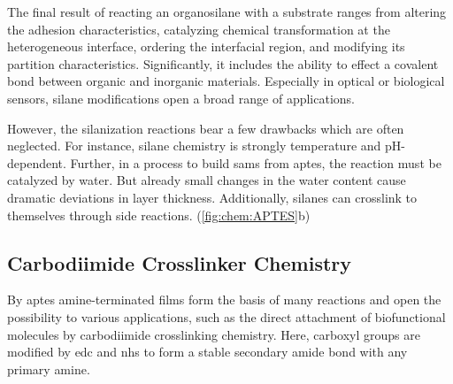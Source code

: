 The final result of reacting an organosilane with a substrate ranges from altering the adhesion characteristics, catalyzing chemical transformation at the heterogeneous interface, ordering the interfacial region, and modifying its partition characteristics. Significantly, it includes the ability to effect a covalent bond between organic and inorganic materials. Especially in optical or biological sensors, silane modifications open a broad range of applications.\cite{lit:chem:sin:langeDiss,lit:Anti-EpCAM-PAA,lit:chem:aptes:SilaneReview}

However, the silanization reactions bear a few drawbacks which are often neglected. For instance, silane chemistry is strongly temperature and pH-dependent.\cite{lit:chem:silaizationTemp,lit:chem:silanizationParameters} Further, in a process to build \glspl{sam} from \gls{aptes}, the reaction must be catalyzed by water. But already small changes in the water content cause dramatic deviations in layer thickness.\cite{lit:chem:sin:selectivemod} Additionally, silanes can crosslink to themselves through side reactions. (\cref{fig:chem:APTES}b) \cite{lit:chem:aptes:Crosslink}



\subsection{Carbodiimide Crosslinker Chemistry}
By \gls{aptes} \gls{amine}-terminated films form the basis of many reactions and open the possibility to various applications, such as the direct attachment of biofunctional molecules by carbodiimide crosslinking chemistry.\cite{lit:bio:BioconjugateTechniques} Here, \gls{carboxyl} groups are modified by \gls{edc} and \gls{nhs} to form a stable secondary \gls{amide} bond with any primary \gls{amine}.

